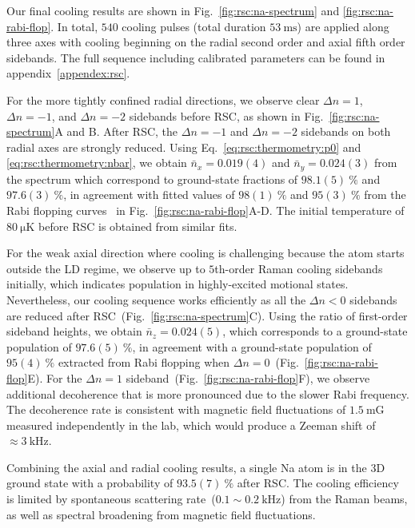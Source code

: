 Our final cooling results are shown in Fig.~\ref{fig:rsc:na-spectrum} and
\ref{fig:rsc:na-rabi-flop}.
In total, $540$ cooling pulses (total duration $53~\mathrm{ms}$) are applied
along three axes with cooling beginning on the radial second order
and axial fifth order sidebands.
The full sequence including calibrated parameters can be found in appendix~\ref{appendex:rsc}.

For the more tightly confined radial directions,
we observe clear $\Delta n=1$, $\Delta n=-1$, and $\Delta n=-2$ sidebands before RSC,
as shown in Fig.~\ref{fig:rsc:na-spectrum}A and B.
After RSC, the $\Delta n=-1$ and $\Delta n=-2$ sidebands
on both radial axes are strongly reduced.
Using Eq.~\ref{eq:rsc:thermometry:p0} and \ref{eq:rsc:thermometry:nbar},
we obtain $\bar{n}_x=0.019(4)$ and $\bar{n}_y=0.024(3)$ from the spectrum which
correspond to ground-state fractions of $98.1(5)~\mathrm{\%}$ and $97.6(3)~\mathrm{\%}$,
in agreement with fitted values of $98(1)~\mathrm{\%}$ and $95(3)~\mathrm{\%}$
from the Rabi flopping curves~\cite{meekhof_generation_1996}
in Fig.~\ref{fig:rsc:na-rabi-flop}A-D.
The initial temperature of $80~\mathrm{\mu K}$ before RSC is obtained from similar fits.

For the weak axial direction
where cooling is challenging because the atom starts outside the LD regime,
we observe up to $5$th-order Raman cooling sidebands initially,
which indicates population in highly-excited motional states.
Nevertheless, our cooling sequence works efficiently
as all the $\Delta n<0$ sidebands are reduced after RSC~(Fig.~\ref{fig:rsc:na-spectrum}C).
Using the ratio of first-order sideband heights, we obtain $\bar{n}_z=0.024(5)$,
which corresponds to a ground-state population of $97.6(5)~\mathrm{\%}$,
in agreement with a ground-state population of $95(4)~\mathrm{\%}$ extracted from Rabi flopping
when $\Delta n=0$~(Fig.~\ref{fig:rsc:na-rabi-flop}E).
For the $\Delta n=1$ sideband~(Fig.~\ref{fig:rsc:na-rabi-flop}F),
we observe additional decoherence that is more pronounced due to the slower Rabi frequency.
The decoherence rate is consistent with magnetic field fluctuations of $1.5~\mathrm{mG}$
measured independently in the lab,
which would produce a Zeeman shift of $\approx\!3~\mathrm{kHz}$.

Combining the axial and radial cooling results,
a single Na atom is in the 3D ground state with a probability of $93.5(7)~\mathrm{\%}$ after RSC.
The cooling efficiency is limited by spontaneous scattering rate~($0.1\sim0.2~\mathrm{kHz}$)
from the Raman beams, as well as spectral broadening from magnetic field fluctuations.

